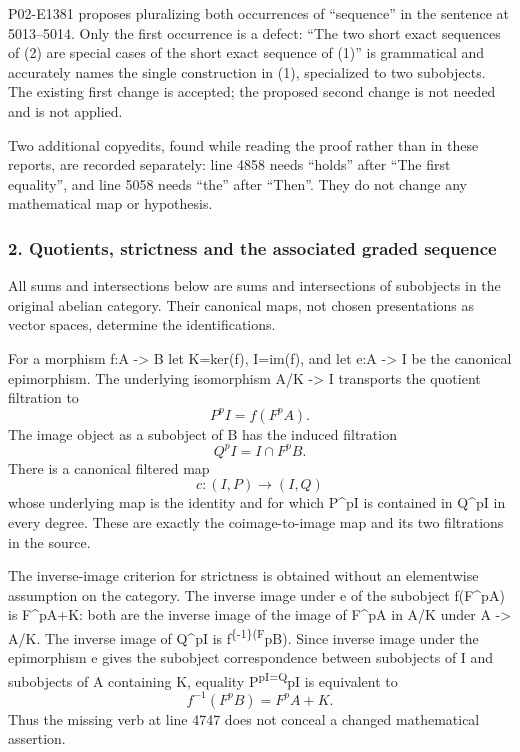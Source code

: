 \documentclass[11pt]{article}
\begin{document}
P02-E1381 proposes pluralizing both occurrences of ``sequence'' in the sentence at 5013--5014. Only the first occurrence is a defect: ``The two short exact sequences of (2) are special cases of the short exact sequence of (1)'' is grammatical and accurately names the single construction in (1), specialized to two subobjects. The existing first change is accepted; the proposed second change is not needed and is not applied.

Two additional copyedits, found while reading the proof rather than in these reports, are recorded separately: line 4858 needs ``holds'' after ``The first equality'', and line 5058 needs ``the'' after ``Then''. They do not change any mathematical map or hypothesis.

\subsubsection{2. Quotients, strictness and the associated graded sequence}\label{quotients-strictness-and-the-associated-graded-sequence}

All sums and intersections below are sums and intersections of subobjects in the original abelian category. Their canonical maps, not chosen presentations as vector spaces, determine the identifications.

For a morphism f:A -\textgreater{} B let K=ker(f), I=im(f), and let e:A -\textgreater{} I be the canonical epimorphism. The underlying isomorphism A/K -\textgreater{} I transports the quotient filtration to \[
P^pI=f(F^pA).
\] The image object as a subobject of B has the induced filtration \[
Q^pI=I\cap F^pB.
\] There is a canonical filtered map \[
c:(I,P)\longrightarrow(I,Q)
\] whose underlying map is the identity and for which P\^{}pI is contained in Q\^{}pI in every degree. These are exactly the coimage-to-image map and its two filtrations in the source.

The inverse-image criterion for strictness is obtained without an elementwise assumption on the category. The inverse image under e of the subobject f(F\^{}pA) is F\^{}pA+K: both are the inverse image of the image of F\^{}pA in A/K under A -\textgreater{} A/K. The inverse image of Q\^{}pI is f\textsuperscript{\{-1\}(F}pB). Since inverse image under the epimorphism e gives the subobject correspondence between subobjects of I and subobjects of A containing K, equality P\textsuperscript{pI=Q}pI is equivalent to \[
f^{-1}(F^pB)=F^pA+K.                                      \tag{2.1}
\] Thus the missing verb at line 4747 does not conceal a changed mathematical assertion.
\end{document}
